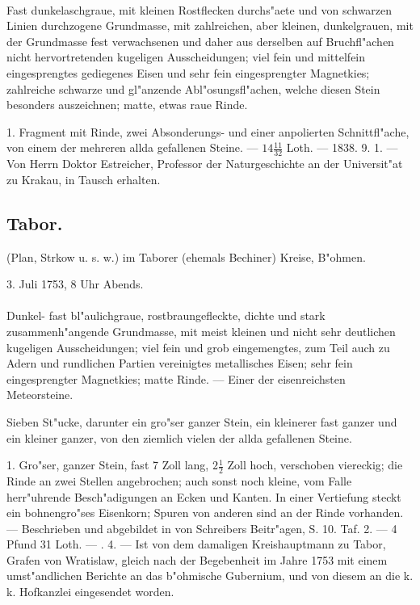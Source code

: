 \documentclass[a4paper, 11pt, oneside, polutonikogreek, german]{article}
\begin{document}
\paragraph{}
Fast dunkelaschgraue, mit kleinen Rostflecken durchs"aete und von schwarzen Linien durchzogene Grundmasse, mit zahlreichen, aber kleinen, dunkelgrauen, mit der Grundmasse fest verwachsenen und daher aus derselben auf Bruchfl"achen nicht hervortretenden kugeligen Ausscheidungen; viel fein und mittelfein eingesprengtes gediegenes Eisen und sehr fein eingesprengter Magnetkies; zahlreiche schwarze und gl"anzende Abl"osungsfl"achen, welche diesen Stein besonders auszeichnen; matte, etwas raue Rinde.

1. Fragment mit Rinde, zwei Absonderungs- und einer anpolierten Schnittfl"ache, von einem der mehreren allda gefallenen Steine. --- $14\frac{11}{32}$ Loth. --- 1838. 9. 1. --- Von Herrn Doktor Estreicher, Professor der Naturgeschichte an der Universit"at zu Krakau, in Tausch erhalten.
\subsection{Tabor.}
\begin{center}
\small
(Plan, Strkow u. s. w.) im Taborer (ehemals Bechiner) Kreise, B"ohmen.

3. Juli 1753, 8 Uhr Abends.
\end{center}
\paragraph{}
Dunkel- fast bl"aulichgraue, rostbraungefleckte, dichte und stark zusammenh"angende Grundmasse, mit meist kleinen und nicht sehr deutlichen kugeligen Ausscheidungen; viel fein und grob eingemengtes, zum Teil auch zu Adern und rundlichen Partien vereinigtes metallisches Eisen; sehr fein eingesprengter Magnetkies; matte Rinde. --- Einer der eisenreichsten Meteorsteine.

Sieben St"ucke, darunter ein gro"ser ganzer Stein, ein kleinerer fast ganzer und ein kleiner ganzer, von den ziemlich vielen der allda gefallenen Steine.

1. Gro"ser, ganzer Stein, fast 7 Zoll lang, $2\frac{1}{2}$ Zoll hoch, verschoben viereckig; die Rinde an zwei Stellen angebrochen; auch sonst noch kleine, vom Falle herr"uhrende Besch"adigungen an Ecken und Kanten. In einer Vertiefung steckt ein bohnengro"ses Eisenkorn; Spuren von anderen sind an der Rinde vorhanden. --- Beschrieben und abgebildet in von Schreibers Beitr"agen, S. 10. Taf. 2. --- 4 Pfund 31 Loth. --- . 4. --- Ist von dem damaligen Kreishauptmann zu Tabor, Grafen von Wratislaw, gleich nach der Begebenheit im Jahre 1753 mit einem umst"andlichen Berichte an das b"ohmische Gubernium, und von diesem an die k. k. Hofkanzlei eingesendet worden.
\end{document}
